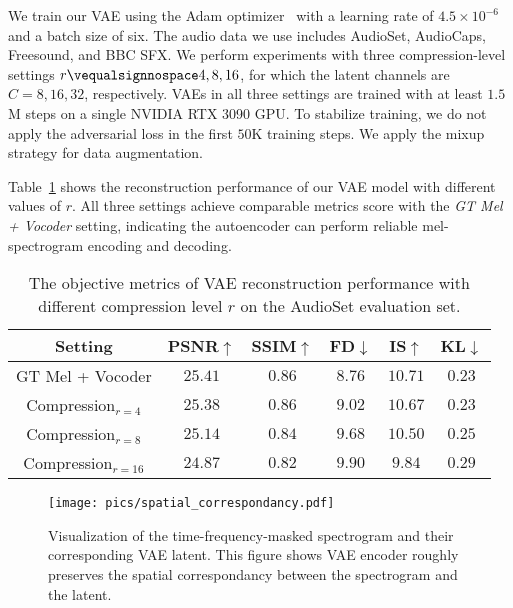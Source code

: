 We train our VAE using the Adam optimizer~\cite{kingma2014adam} with a learning rate of $4.5\times 10^{-6}$ and a batch size of six. The audio data we use includes AudioSet, AudioCaps, Freesound, and BBC SFX. We perform experiments with three compression-level settings $r\vequalsignnospace4,8,16$, for which the latent channels are $C=8,16,32$, respectively.  VAEs in all three settings are trained with at least $1.5$M steps on a single NVIDIA RTX 3090 GPU. To stabilize training, we do not apply the adversarial loss in the first $50$K training steps. We apply the mixup~\cite{kong2020panns} strategy for data augmentation. 

Table~\ref{tab: vae-reconstruct} shows the reconstruction performance of our VAE model with different values of $r$. All three settings achieve comparable metrics score with the \textit{GT Mel + Vocoder} setting, indicating the autoencoder can perform reliable mel-spectrogram encoding and decoding.

\begin{table}[htbp]
\small
\centering
\begin{tabular}{cccccc}
\toprule
        Setting        & PSNR$\uparrow$  & SSIM$\uparrow$ & FD$\downarrow$   & IS$\uparrow$   & KL$\downarrow$   \\
\midrule
GT Mel + Vocoder & $25.41$ & $0.86$ & $8.76$ & $10.71$ & $0.23$ \\
\midrule
Compression$_{r=4}$     & $25.38$ & $0.86$ & $9.02$ & $10.67$ & $0.23$ \\
Compression$_{r=8}$     & $25.14$ & $0.84$ & $9.68$ & $10.50$ & $0.25$ \\
Compression$_{r=16}$    & $24.87$ & $0.82$ & $9.90$ & $9.84$ & $0.29$ \\
\bottomrule
\end{tabular}
\caption{The objective metrics of VAE reconstruction performance with different compression level $r$ on the AudioSet evaluation set.}
\label{tab: vae-reconstruct}
\end{table}

\begin{figure}[htbp]
    \centering
    \texttt{[image: pics/spatial\_correspondancy.pdf]}
    \caption{Visualization of the time-frequency-masked spectrogram and their corresponding VAE latent. This figure shows VAE encoder roughly preserves the spatial correspondancy between the spectrogram and the latent.}
    \label{fig:demo-spatial-correspondancy}
\end{figure}

